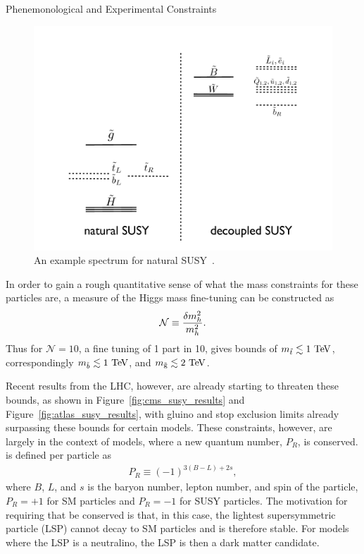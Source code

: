 \begin{section}{Phenemonological and Experimental Constraints}
\begin{figure}[tbp!]
\begin{center}
\includegraphics[angle=0,width=0.60\columnwidth]{fig/natural_susy_spectrum.png}
\end{center}
\caption{An example spectrum for natural SUSY~\cite{Papucci:2011wy}.}
\label{fig:natural_susy_spectrum}
\end{figure}

In order to gain a rough quantitative sense of what the mass constraints for these particles are, a measure of the Higgs mass fine-tuning can be constructed as
\begin{align}
\mathcal{N} \equiv \frac{\delta m_{h}^2}{m_{h}^2}.
\end{align}
Thus for $\mathcal{N} = 10$, a fine tuning of 1 part in 10, gives bounds of $m_{\tilde{t}} \lesssim 1~\mathrm{Te\kern -0.1em V}$, correspondingly $m_{\tilde{b}} \lesssim 1~\mathrm{Te\kern -0.1em V}$, and $m_{\tilde{\mathrm{g}}} \lesssim 2~\mathrm{Te\kern -0.1em V}$.

Recent results from the LHC, however, are already starting to threaten these bounds, as shown in Figure~\ref{fig:cms_susy_results} and Figure~\ref{fig:atlas_susy_results}, with gluino and stop exclusion limits already surpassing these bounds for certain models.
These constraints, however, are largely in the context of \RPC models, where a new quantum number, $P_R$, is conserved.
\RP is defined per particle as
\begin{align}
P_R \equiv (-1)^{3(B-L)+2s},
\end{align}
where $B$, $L$, and $s$ is the baryon number, lepton number, and spin of the particle, $P_R = +1$ for SM particles and $P_R = -1$ for SUSY particles.
The motivation for requiring that \RP be conserved is that, in this case, the lightest supersymmetric particle (LSP) cannot decay to SM particles and is therefore stable.
For models where the LSP is a neutralino, the LSP is then a dark matter candidate.


\end{section}
